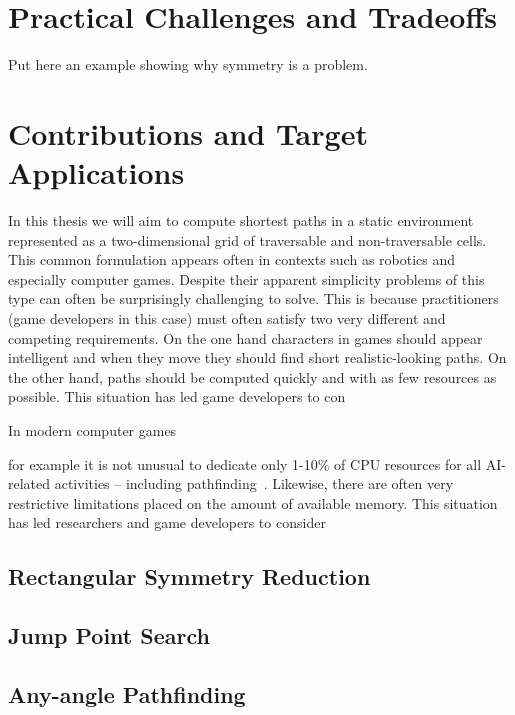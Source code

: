\section{Practical Challenges and Tradeoffs}
Put here an example showing why symmetry is a problem.

\section{Contributions and Target Applications}
In this thesis we will aim to compute shortest paths in a static environment
represented as a two-dimensional grid of traversable and non-traversable cells.
This common formulation appears often in contexts such as robotics and especially 
computer games. Despite their apparent simplicity problems of this type can often 
be surprisingly challenging to solve. This is because practitioners 
(game developers in this case) must often satisfy two very different and competing 
requirements. On the one hand characters in games should appear intelligent and 
when they move they should find short realistic-looking paths. On the other hand, 
paths should be computed quickly and with as few resources as possible. 
This situation has led game developers to con

In modern computer games 

for example it is not unusual to dedicate only 1-10\% of 
CPU resources for all AI-related activities -- including pathfinding~\cite{tozour08}.
Likewise, there are often very restrictive limitations placed on the amount
of available memory. This situation has led researchers and game developers
to consider 

\subsection{Rectangular Symmetry Reduction}
\subsection{Jump Point Search}
\subsection{Any-angle Pathfinding}

